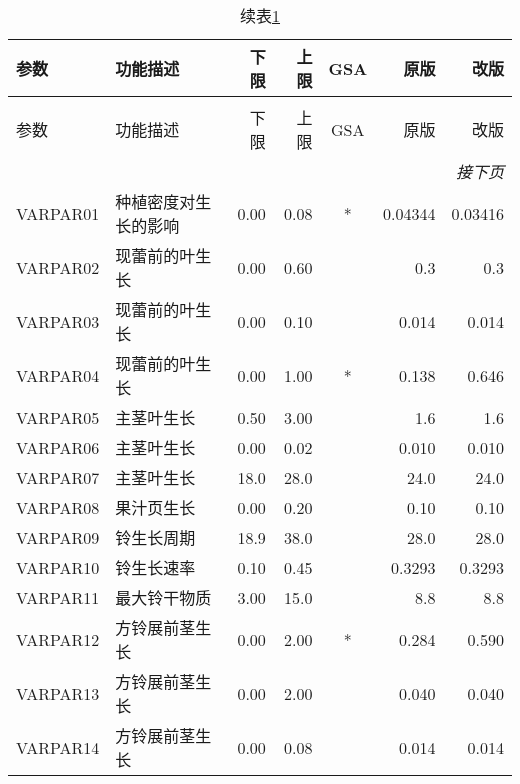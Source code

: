 \begin{longtable}{llrrcrr}
    \caption{Cotton2K 参数列表及率定值}\label{tab:parameters}                         \\
    \toprule
    参数     & 功能描述                   & 下限   & 上限   & GSA & 原版    & 改版    \\
    \midrule\endfirsthead
    \caption*{续表\ref{tab:parameters}}                                               \\
    \toprule
    参数     & 功能描述                   & 下限   & 上限   & GSA & 原版    & 改版    \\
    \midrule
    \endhead
    \bottomrule
    \multicolumn{7}{r}{\textit{接下页}}                                               \\
    \endfoot
    \bottomrule
    \endlastfoot
    VARPAR01 & 种植密度对生长的影响       & 0.00   & 0.08   & *   & 0.04344 & 0.03416 \\
    VARPAR02 & 现蕾前的叶生长             & 0.00   & 0.60   &     & 0.3     & 0.3     \\
    VARPAR03 & 现蕾前的叶生长             & 0.00   & 0.10   &     & 0.014   & 0.014   \\
    VARPAR04 & 现蕾前的叶生长             & 0.00   & 1.00   & *   & 0.138   & 0.646   \\
    VARPAR05 & 主茎叶生长                 & 0.50   & 3.00   &     & 1.6     & 1.6     \\
    VARPAR06 & 主茎叶生长                 & 0.00   & 0.02   &     & 0.010   & 0.010   \\
    VARPAR07 & 主茎叶生长                 & 18.0   & 28.0   &     & 24.0    & 24.0    \\
    VARPAR08 & 果汁页生长                 & 0.00   & 0.20   &     & 0.10    & 0.10    \\
    VARPAR09 & 铃生长周期                 & 18.9   & 38.0   &     & 28.0    & 28.0    \\
    VARPAR10 & 铃生长速率                 & 0.10   & 0.45   &     & 0.3293  & 0.3293  \\
    VARPAR11 & 最大铃干物质               & 3.00   & 15.0   &     & 8.8     & 8.8     \\
    VARPAR12 & 方铃展前茎生长             & 0.00   & 2.00   & *   & 0.284   & 0.590   \\
    VARPAR13 & 方铃展前茎生长             & 0.00   & 2.00   &     & 0.040   & 0.040   \\
    VARPAR14 & 方铃展前茎生长             & 0.00   & 0.08   &     & 0.014   & 0.014   \\

\end{longtable}
